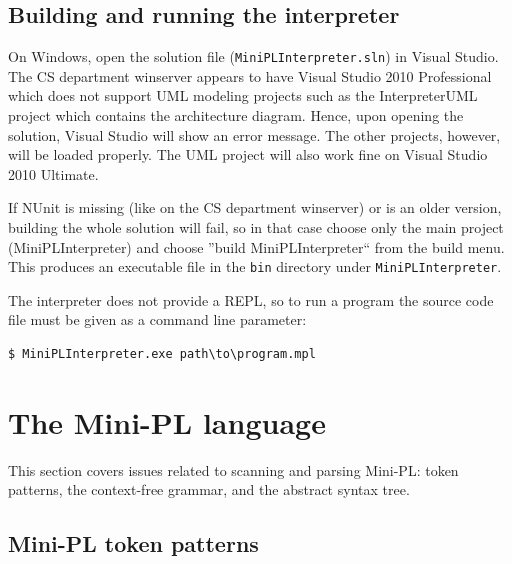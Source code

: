 \documentclass[a4paper,11pt]{article}
\begin{document}
\subsection{Building and running the interpreter}

On Windows, open the solution file (\verb,MiniPLInterpreter.sln,) in Visual Studio. The CS department winserver appears to have Visual Studio 2010 Professional which does not support UML modeling projects such as the InterpreterUML project which contains the architecture diagram. Hence, upon opening the solution, Visual Studio will show an error message. The other projects, however, will be loaded properly. The UML project will also work fine on Visual Studio 2010 Ultimate.

If NUnit is missing (like on the CS department winserver) or is an older version, building the whole solution will fail, so in that case choose only the main project (MiniPLInterpreter) and choose ''build MiniPLInterpreter`` from the build menu. This produces an executable file in the \verb,bin, directory under \verb,MiniPLInterpreter,.

The interpreter does not provide a REPL, so to run a program the source code file must be given as a command line parameter:

\begin{verbatim}
$ MiniPLInterpreter.exe path\to\program.mpl
\end{verbatim}

\newpage
\section{The Mini-PL language}

This section covers issues related to scanning and parsing Mini-PL: token patterns, the context-free grammar, and the abstract syntax tree.

\subsection{Mini-PL token patterns}
\end{document}
